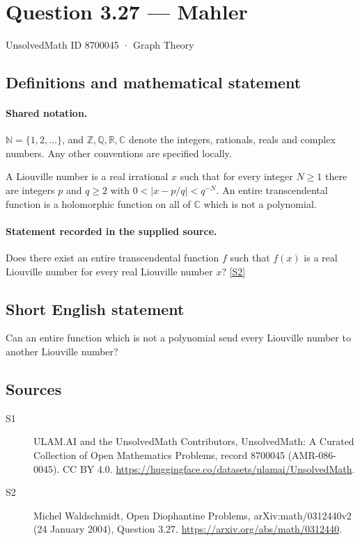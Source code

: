 \documentclass[11pt]{article}
\newcommand{\sref}[2]{\hyperlink{source:#1:#2}{[S#2]}}
\begin{document}
\setcounter{section}{8700044}
\section{Question 3.27 — Mahler}\label{8700045}
{\small\sffamily UnsolvedMath ID 8700045 · Graph Theory}
\subsection{Definitions and mathematical statement}

\paragraph{Shared notation.}$\mathbb N=\{1,2,\ldots\}$, and $\mathbb Z,\mathbb Q,\mathbb R,\mathbb C$ denote the integers, rationals, reals and complex numbers. Any other conventions are specified locally.


A Liouville number is a real irrational $x$ such that for every integer $N\ge1$ there are integers $p$ and $q\ge2$ with $0<|x-p/q|<q^{-N}$. An entire transcendental function is a holomorphic function on all of $\mathbb C$ which is not a polynomial.
\paragraph{Statement recorded in the supplied source.}
Does there exist an entire transcendental function $f$ such that $f(x)$ is a real Liouville number for every real Liouville number $x$? \sref{8700045}{2}
\subsection{Short English statement}
Can an entire function which is not a polynomial send every Liouville number to another Liouville number?
\subsection{Sources}
\begin{description}
\item[\hypertarget{source:8700045:1}{S1}] ULAM.AI and the UnsolvedMath Contributors, UnsolvedMath: A Curated Collection of Open Mathematics Problems, record 8700045 (AMR-086-0045). CC BY 4.0. \url{https://huggingface.co/datasets/ulamai/UnsolvedMath}.
\item[\hypertarget{source:8700045:2}{S2}] Michel Waldschmidt, Open Diophantine Problems, arXiv:math/0312440v2 (24 January 2004), Question 3.27. \url{https://arxiv.org/abs/math/0312440}.
\end{description}
\label{end:8700045}
\end{document}
